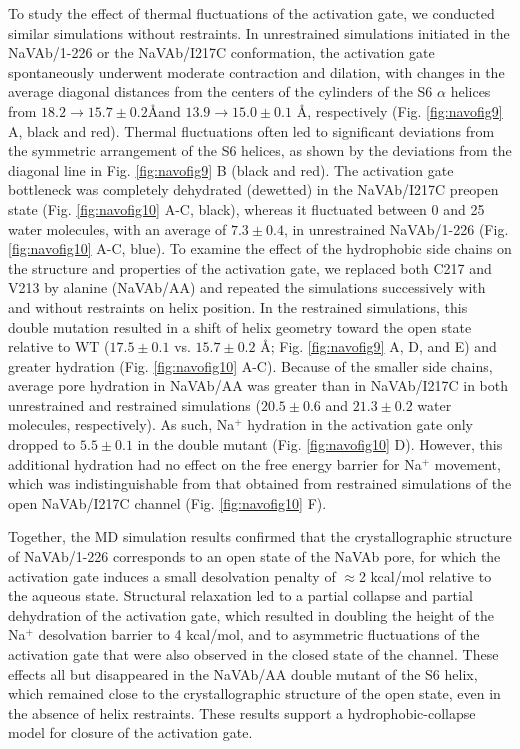 \begin{refsection}
{To study the effect of thermal fluctuations of the activation gate, we conducted similar simulations without restraints. In unrestrained simulations initiated in the NaVAb/1-226 or the NaVAb/I217C conformation, the activation gate spontaneously underwent moderate contraction and dilation, with changes in the average diagonal distances from the centers of the cylinders of the S6 $\alpha$ helices from $18.2 \rightarrow 15.7 \pm 0.2$\AA  and $13.9 \rightarrow 15.0 \pm 0.1$ \AA, respectively (Fig. \ref{fig:navofig9} A, black and red). Thermal fluctuations often led to significant deviations from the symmetric arrangement of the S6 helices, as shown by the deviations from the diagonal line in Fig. \ref{fig:navofig9} B (black and red). The activation gate bottleneck was completely dehydrated (dewetted) in the NaVAb/I217C preopen state (Fig. \ref{fig:navofig10} A-C, black), whereas it fluctuated between 0 and 25 water molecules, with an average of $7.3 \pm 0.4$, in unrestrained NaVAb/1-226 (Fig. \ref{fig:navofig10} A-C, blue).
To examine the effect of the hydrophobic side chains on the structure and properties of the activation gate, we replaced both C217 and V213 by alanine (NaVAb/AA) and repeated the simulations successively with and without restraints on helix position. In the restrained simulations, this double mutation resulted in a shift of helix geometry toward the open state relative to WT ($17.5 \pm 0.1$ vs. $15.7 \pm 0.2 $ \AA; Fig. \ref{fig:navofig9} A, D, and E) and greater hydration (Fig. \ref{fig:navofig10} A-C). Because of the smaller side chains, average pore hydration in NaVAb/AA was greater than in NaVAb/I217C in both unrestrained and restrained simulations ($20.5 \pm 0.6$ and $21.3 \pm 0.2$ water molecules, respectively). As such, Na$^+$ hydration in the activation gate only dropped to $5.5 \pm 0.1$ in the double mutant (Fig. \ref{fig:navofig10} D). However, this additional hydration had no effect on the free energy barrier for Na$^+$ movement, which was indistinguishable from that obtained from restrained simulations of the open NaVAb/I217C channel (Fig. \ref{fig:navofig10} F).

Together, the MD simulation results confirmed that the crystallographic structure of NaVAb/1-226 corresponds to an open state of the NaVAb pore, for which the activation gate induces a small desolvation penalty of $\approx$2 kcal/mol relative to the aqueous state. Structural relaxation led to a partial collapse and partial dehydration of the activation gate, which resulted in doubling the height of the Na$^+$ desolvation barrier to 4 kcal/mol, and to asymmetric fluctuations of the activation gate that were also observed in the closed state of the channel. These effects all but disappeared in the NaVAb/AA double mutant of the S6 helix, which remained close to the crystallographic structure of the open state, even in the absence of helix restraints. These results support a hydrophobic-collapse model for closure of the activation gate.

}
\end{refsection}

